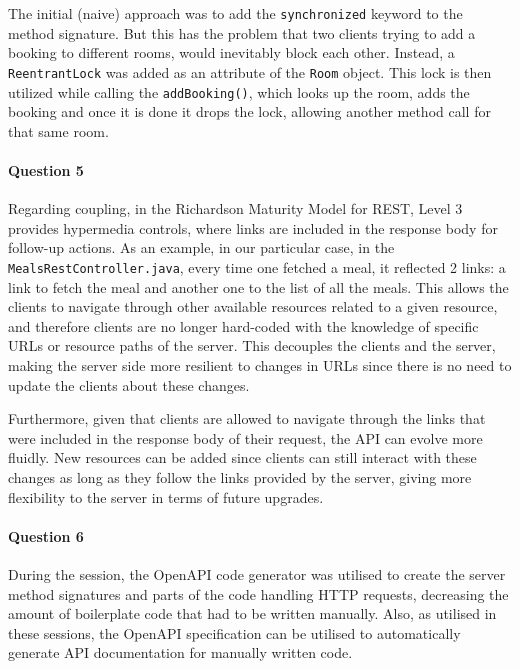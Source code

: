 \documentclass{ds-report}
\begin{document}
    The initial (naive) approach was to add the \texttt{synchronized} keyword to the method signature. But this has the problem that two clients trying to add a booking to different rooms, would inevitably block each other. Instead, a \texttt{ReentrantLock} was added as an attribute of the \texttt{Room} object. This lock is then utilized while calling the \texttt{addBooking()}, which looks up the room, adds the booking and once it is done it drops the lock, allowing another method call for that same room. 

    \paragraph{Question 5} 

    Regarding coupling, in the Richardson Maturity Model for REST, Level 3 provides hypermedia controls, where links are included in the response body for follow-up actions. As an example, in our particular case, in the \texttt{MealsRestController.java}, every time one fetched a meal, it reflected 2 links: a link to fetch the meal and another one to the list of all the meals. This allows the clients to navigate through other available resources related to a given resource, and therefore clients are no longer hard-coded with the knowledge of specific URLs or resource paths of the server. This decouples the clients and the server, making the server side more resilient to changes in URLs since there is no need to update the clients about these changes.

    Furthermore, given that clients are allowed to navigate through the links that were included in the response body of their request, the API can evolve more fluidly. New resources can be added since clients can still interact with these changes as long as they follow the links provided by the server, giving more flexibility to the server in terms of future upgrades.
    
    \paragraph{Question 6} 
    
    During the session, the OpenAPI code generator was utilised to create the server method signatures and parts of the code handling HTTP requests, decreasing the amount of boilerplate code that had to be written manually. Also, as utilised in these sessions, the OpenAPI specification can be utilised to automatically generate API documentation for manually written code.
\end{document}
